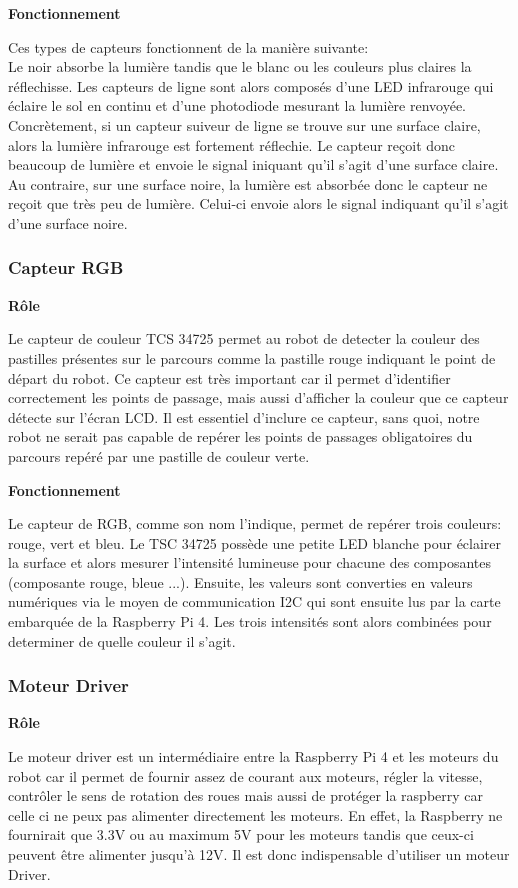 \documentclass[11pt,a4paper]{article}
\begin{document}
\textbf{Fonctionnement}

Ces types de capteurs fonctionnent de la manière suivante:\\
Le noir absorbe la lumière tandis que le blanc ou les couleurs plus claires la réflechisse.
Les capteurs de ligne sont alors composés d'une LED infrarouge qui éclaire le sol en continu et d'une photodiode mesurant la lumière renvoyée.
Concrètement, si un capteur suiveur de ligne se trouve sur une surface claire, alors la lumière infrarouge est fortement réflechie.
Le capteur reçoit donc beaucoup de lumière et envoie le signal iniquant qu'il s'agit d'une surface claire.
Au contraire, sur une surface noire, la lumière est absorbée donc le capteur ne reçoit que très peu de lumière.
Celui-ci envoie alors le signal indiquant qu'il s'agit d'une surface noire.

\subsubsection{Capteur RGB}
\textbf{Rôle}

Le capteur de couleur TCS 34725 permet au robot de detecter la couleur des pastilles présentes sur le parcours comme la pastille rouge indiquant le point de départ du robot.
Ce capteur est très important car il permet d'identifier correctement les points de passage, mais aussi d'afficher la couleur que ce capteur détecte sur l'écran LCD.
Il est essentiel d'inclure ce capteur, sans quoi, notre robot ne serait pas capable de repérer les points de passages obligatoires du parcours repéré par une pastille de couleur verte.

\textbf{Fonctionnement}

Le capteur de RGB, comme son nom l'indique, permet de repérer trois couleurs: rouge, vert et bleu.
Le TSC 34725 possède une petite LED blanche pour éclairer la surface et alors mesurer l'intensité lumineuse pour chacune des composantes (composante rouge, bleue ...).
Ensuite, les valeurs sont converties en valeurs numériques via le moyen de communication I2C qui sont ensuite lus par la carte embarquée de la Raspberry Pi 4.
Les trois intensités sont alors combinées pour determiner de quelle couleur il s'agit.

\subsubsection{Moteur Driver}
\textbf{Rôle}

Le moteur driver est un intermédiaire entre la Raspberry Pi 4 et les moteurs du robot car il permet de fournir assez de courant aux moteurs, régler la vitesse, contrôler le sens de rotation des roues mais aussi de protéger la raspberry car celle ci ne peux pas alimenter directement les moteurs.
En effet, la Raspberry ne fournirait que 3.3V ou au maximum 5V pour les moteurs tandis que ceux-ci peuvent être alimenter jusqu’à 12V. Il est donc indispensable d’utiliser un moteur Driver.
\end{document}
